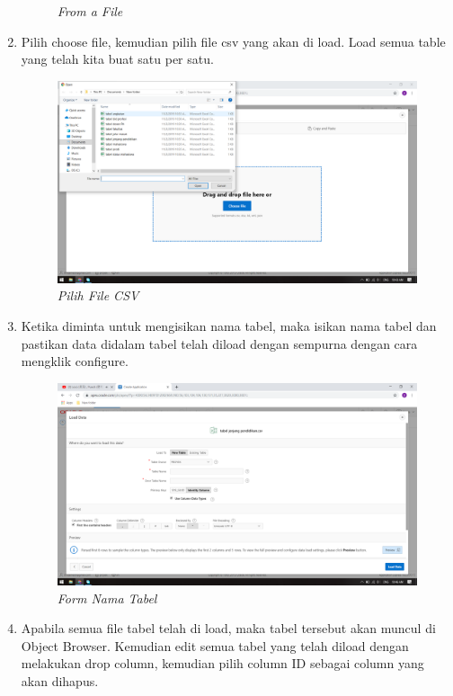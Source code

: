 \begin{enumerate}
\begin{figure}[H]
    \caption{\textit{From a File}}
    \label{foto3}
 \end{figure}
 \item Pilih choose file, kemudian pilih file csv yang akan di load. Load semua table yang telah kita buat satu per satu.
 \begin{figure}[H]
    \centering
    \includegraphics[scale=0.3]{figures/1}
    \caption{\textit{Pilih File CSV}}
    \label{foto1}
 \end{figure}
 \item Ketika diminta untuk mengisikan nama tabel, maka isikan nama tabel dan pastikan data didalam tabel telah diload dengan sempurna dengan cara mengklik configure.
 \begin{figure}[H]
    \centering
    \includegraphics[scale=0.3]{figures/2}
    \caption{\textit{Form Nama Tabel}}
    \label{foto2}
 \end{figure}
 \item Apabila semua file tabel telah di load, maka tabel tersebut akan muncul di Object Browser. Kemudian edit semua tabel yang telah diload dengan melakukan drop column, kemudian pilih column ID sebagai column yang akan dihapus.

\end{enumerate}
